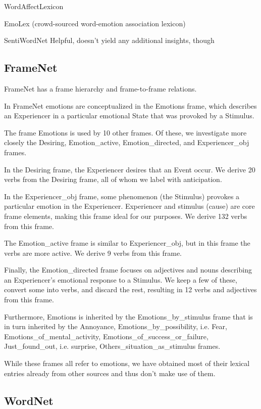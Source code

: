 WordAffectLexicon



EmoLex (crowd-sourced word-emotion association lexicon)


SentiWordNet
Helpful, doesn't yield any additional insights, though


\subsection{FrameNet}

FrameNet has a frame hierarchy and frame-to-frame relations.

In FrameNet emotions are conceptualized in the Emotions frame, which describes an Experiencer in a particular emotional State that was provoked by a Stimulus.

The frame Emotions is used by 10 other frames. Of these, we investigate more closely the Desiring, Emotion\_active, Emotion\_directed, and Experiencer\_obj frames.

In the Desiring frame, the Experiencer desires that an Event occur. We derive 20 verbs from the Desiring frame, all of whom we label with anticipation.

In the Experiencer\_obj frame, some phenomenon (the Stimulus) provokes a particular emotion in the Experiencer. Experiencer and stimulus (cause) are core frame elements, making this frame ideal for our purposes. We derive 132 verbs from this frame.

The Emotion\_active frame is similar to Experiencer\_obj, but in this frame the verbs are more active. We derive 9 verbs from this frame.

Finally, the Emotion\_directed frame focuses on adjectives and nouns describing an Experiencer's emotional response to a Stimulus. We keep a few of these, convert some into verbs, and discard the rest, resulting in 12 verbs and adjectives from this frame.

Furthermore, Emotions is inherited by the Emotions\_by\_stimulus frame that is in turn inherited by the Annoyance, Emotions\_by\_possibility, i.e. Fear, Emotions\_of\_mental\_activity, Emotions\_of\_success\_or\_failure, Just\_found\_out, i.e. surprise, Others\_situation\_as\_stimulus frames.

While these frames all refer to emotions, we have obtained most of their lexical entries already from other sources and thus don't make use of them.


\subsection{WordNet}


